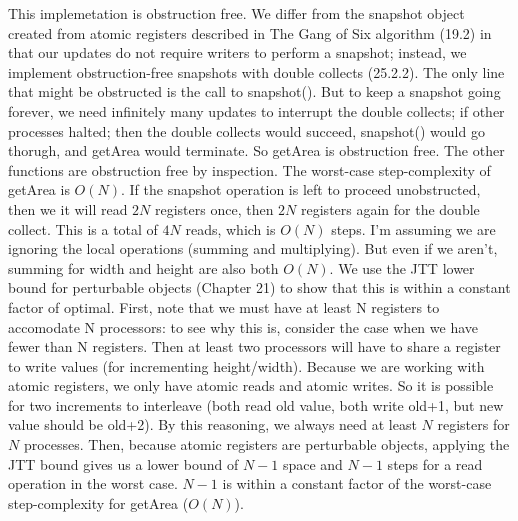 \documentclass{article}
\begin{document}
This implemetation is obstruction free. We differ from the snapshot object created from atomic registers described in The Gang of Six algorithm (19.2) in that our updates do not require writers to perform a snapshot; instead, we implement obstruction-free snapshots with double collects (25.2.2). The only line that might be obstructed is the call to snapshot(). But to keep a snapshot going forever, we need infinitely many updates to interrupt the double collects; if other processes halted; then the double collects would succeed, snapshot() would go thorugh, and getArea would terminate. So getArea is obstruction free. The other functions are obstruction free by inspection. 
The worst-case step-complexity of getArea is $O(N)$. If the snapshot operation is left to proceed unobstructed, then we it will read $2N$ registers once, then $2N$ registers again for the double collect. This is a total of $4N$ reads, which is $O(N)$ steps. I'm assuming we are ignoring the local operations (summing and multiplying). But even if we aren't, summing for width and height are also both $O(N)$.
We use the JTT lower bound for perturbable objects (Chapter 21) to show that this is within a constant factor of optimal. First, note that we must have at least N registers to accomodate N processors: to see why this is, consider the case when we have fewer than N registers. Then at least two processors will have to share a register to write values (for incrementing height/width). Because we are working with atomic registers, we only have atomic reads and atomic writes. So it is possible for two increments to interleave (both read old value, both write old+1, but new value should be old+2). By this reasoning, we always need at least $N$ registers for $N$ processes. Then, because atomic registers are perturbable objects, applying the JTT bound gives us a lower bound of $N-1$ space and $N-1$ steps for a read operation in the worst case. $N-1$ is within a constant factor of the worst-case step-complexity for getArea ($O(N)$). 
\end{document}
